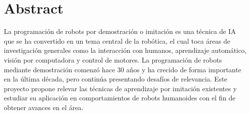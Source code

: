 \chapter*{Abstract}

La programación de robots por demostración o imitación es una técnica de IA que se ha convertido en un tema central de la robótica, el cual toca áreas de investigación generales como la interacción con humanos, aprendizaje automático, visión por computadora y control de motores\cite{Billard08chapter}. La programación de robots mediante demostración comenzó hace 30 años y ha crecido de forma importante en la última década, pero continúa presentando desafíos de relevancia.
Este proyecto propone relevar las técnicas de aprendizaje por imitación existentes y estudiar su aplicación en comportamientos de robots humanoides con el fin de obtener avances en el área.
